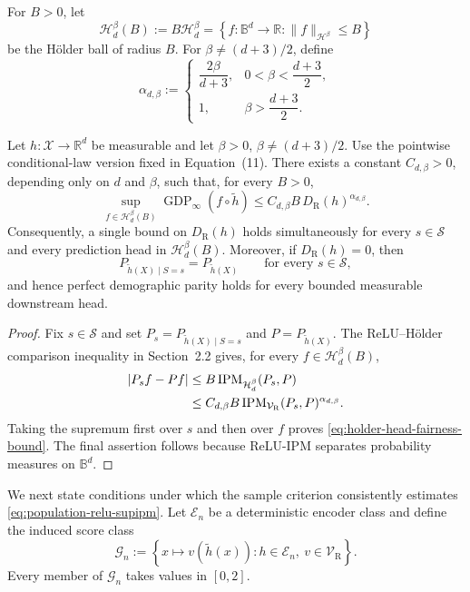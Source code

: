\documentclass[10pt]{article}
\begin{document}
For \(B>0\), let
\[
  \mathcal H_d^\beta(B)
  :=B\mathcal H_d^\beta
  =\left\{f:\mathbb B^d\to\mathbb R:
           \lVert f\rVert_{\mathcal H^\beta}\le B\right\}
\]
be the H\"older ball of radius \(B\).  For
\(\beta\ne(d+3)/2\), define
\[
  \alpha_{d,\beta}:=
  \begin{cases}
    \dfrac{2\beta}{d+3}, & 0<\beta<\dfrac{d+3}{2},\\[2mm]
    1, & \beta>\dfrac{d+3}{2}.
  \end{cases}
\]

\begin{lemma}
\label{lem:worst-case-fairness-transfer}
Let \(h:\mathcal X\to\mathbb R^d\) be measurable and let
\(\beta>0\), \(\beta\ne(d+3)/2\).  Use the pointwise conditional-law
version fixed in Equation~(11).  There exists a constant
\(C_{d,\beta}>0\), depending only on \(d\) and \(\beta\), such that,
for every \(B>0\),
\begin{equation}
  \sup_{f\in\mathcal H_d^\beta(B)}
  \operatorname{GDP}_\infty(f\circ\widetilde h)
  \le
  C_{d,\beta}B\,D_{\mathrm R}(h)^{\alpha_{d,\beta}}.
  \label{eq:holder-head-fairness-bound}
\end{equation}
Consequently, a single bound on \(D_{\mathrm R}(h)\) holds
simultaneously for every \(s\in\mathcal S\) and every prediction head in
\(\mathcal H_d^\beta(B)\).  Moreover, if \(D_{\mathrm R}(h)=0\), then
\[
  P_{\widetilde h(X)\mid S=s}=P_{\widetilde h(X)}
  \qquad\text{for every }s\in\mathcal S,
\]
and hence perfect demographic parity holds for every bounded measurable
downstream head.
\end{lemma}

\begin{proof}
Fix \(s\in\mathcal S\) and set
\(P_s=P_{\widetilde h(X)\mid S=s}\) and
\(P=P_{\widetilde h(X)}\).  The ReLU--H\"older comparison inequality in
Section~2.2 gives, for every \(f\in\mathcal H_d^\beta(B)\),
\begin{align*}
  |P_sf-Pf|
  &\le B\operatorname{IPM}_{\mathcal H_d^\beta}(P_s,P)\\
  &\le C_{d,\beta}B
       \operatorname{IPM}_{\mathcal V_{\mathrm R}}(P_s,P)^%
       {\alpha_{d,\beta}}.
\end{align*}
Taking the supremum first over \(s\) and then over \(f\) proves
\eqref{eq:holder-head-fairness-bound}.  The final assertion follows because
ReLU-IPM separates probability measures on \(\mathbb B^d\).
\end{proof}

We next state conditions under which the sample criterion consistently
estimates \eqref{eq:population-relu-supipm}.  Let \(\mathcal E_n\) be a
deterministic encoder class and define the induced score class
\begin{equation}
  \mathcal G_n
  :=\left\{x\mapsto v\!\left(\widetilde h(x)\right):
      h\in\mathcal E_n,\ v\in\mathcal V_{\mathrm R}\right\}.
  \label{eq:induced-score-class}
\end{equation}
Every member of \(\mathcal G_n\) takes values in \([0,2]\).
\end{document}
